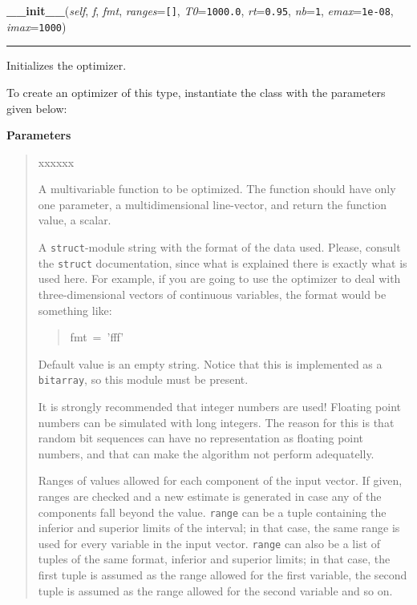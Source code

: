     \vspace{0.5ex}

    \begin{boxedminipage}{\textwidth}

    \raggedright \textbf{\_\_init\_\_}(\textit{self}, \textit{f}, \textit{fmt}, \textit{ranges}=\texttt{\texttt{[}\texttt{]}}, \textit{T0}=\texttt{1000.0}, \textit{rt}=\texttt{0.95}, \textit{nb}=\texttt{1}, \textit{emax}=\texttt{1e-08}, \textit{imax}=\texttt{1000})

    \vspace{-1.5ex}

    \rule{\textwidth}{0.5\fboxrule}

Initializes the optimizer.

To create an optimizer of this type, instantiate the class with the
parameters given below:
    \vspace{1ex}

      \textbf{Parameters}
      \begin{quote}
        \begin{Ventry}{xxxxxx}

          \item[f]


A multivariable function to be optimized. The function should have
only one parameter, a multidimensional line-vector, and return the
function value, a scalar.
          \item[fmt]


A \texttt{struct}-module string with the format of the data used. Please,
consult the \texttt{struct} documentation, since what is explained there
is exactly what is used here. For example, if you are going to use
the optimizer to deal with three-dimensional vectors of continuous
variables, the format would be something like:
\begin{quote}{\ttfamily \raggedright \noindent
fmt~=~'fff'
}\end{quote}

Default value is an empty string. Notice that this is implemented as
a \texttt{bitarray}, so this module must be present.

It is strongly recommended that integer numbers are used! Floating
point numbers can be simulated with long integers. The reason for
this is that random bit sequences can have no representation as
floating point numbers, and that can make the algorithm not perform
adequatelly.
          \item[ranges]


Ranges of values allowed for each component of the input vector. If
given, ranges are checked and a new estimate is generated in case
any of the components fall beyond the value. \texttt{range} can be a
tuple containing the inferior and superior limits of the interval;
in that case, the same range is used for every variable in the input
vector. \texttt{range} can also be a list of tuples of the same format,
inferior and superior limits; in that case, the first tuple is
assumed as the range allowed for the first variable, the second
tuple is assumed as the range allowed for the second variable and so
on.
          \item[T0]



\end{Ventry}
\end{quote}
\end{boxedminipage}

